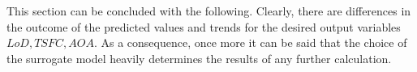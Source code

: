 \FloatBarrier
This section can be concluded with the following.
Clearly, there are differences in the outcome 
of the predicted values and trends for the desired 
output variables $LoD, TSFC, AOA$. As a
consequence, once more it can be said that the 
choice of the surrogate model heavily determines 
the results of any further calculation.